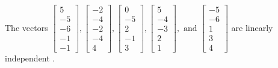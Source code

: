 \begin{exercise}
\begin{exerciseStatement}
  \end{exerciseStatement}
  \begin{exerciseAnswer}
   The vectors \(\left[\begin{array}{r}
5 \\
-5 \\
-6 \\
-1 \\
-1
\end{array}\right] , \left[\begin{array}{r}
-2 \\
-4 \\
-2 \\
-4 \\
4
\end{array}\right] , \left[\begin{array}{r}
0 \\
-5 \\
2 \\
-1 \\
3
\end{array}\right] , \left[\begin{array}{r}
5 \\
-4 \\
-3 \\
2 \\
1
\end{array}\right] , \text{ and } \left[\begin{array}{r}
-5 \\
-6 \\
1 \\
3 \\
4
\end{array}\right]\) are 
  	 linearly independent  .
  


  \end{exerciseAnswer}
\end{exercise}